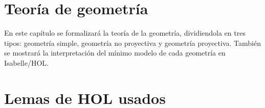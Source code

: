\documentclass[12pt,a4paper,twoside]{book}
\begin{document}
\chapter{Teoría de geometría}
En este capítulo se formalizará la teoría de la geometría, dividiendola en tres tipos:
geometría simple, geometría no proyectiva y geometría proyectiva. También se mostrará 
la interpretación del mínimo modelo de cada geometría en Isabelle/HOL.


\appendix

\chapter{Lemas de HOL usados}


\nocite{LMF, tutorial, Isabelle, Prooftheory, 100theorems, Provers, Isabelle/Isar,
 Mathematical, Naive, Lattices, ALgebra, Tarski, Simple, Finiteplane, Fanoplane}


\end{document}
